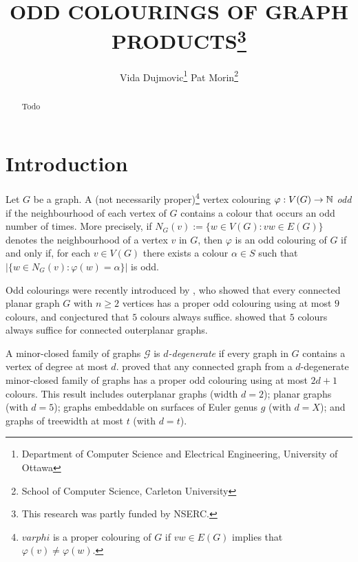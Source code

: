 \documentclass{patmorin}
\title{\MakeUppercase{Odd Colourings of Graph Products}\thanks{This research was partly funded by NSERC.}}
\author{%
  Vida Dujmovic\thanks{Department of Computer Science and Electrical Engineering, University of Ottawa}\qquad
  Pat Morin\thanks{School of Computer Science, Carleton University}
}
\date{}
\begin{document}
\maketitle

\begin{abstract}
  Todo
\end{abstract}

%

\section{Introduction}

Let $G$ be a graph.  A (not necessarily proper)\footnote{$varphi$ is a proper colouring of $G$ if $vw\in E(G)$ implies that $\varphi(v)\neq\varphi(w)$.} vertex colouring $\varphi:V(G)\to\mathbb{N}$ \emph{odd} if the neighbourhood of each vertex of $G$ contains a colour that occurs an odd number of times.  More precisely, if $N_G(v):=\{w\in V(G):vw\in E(G)\}$ denotes the neighbourhood of a vertex $v$ in $G$, then $\varphi$ is an odd colouring of $G$ if and only if, for each $v\in V(G)$ there exists a colour $\alpha\in S$ such that $|\{w\in N_G(v): \varphi(w)=\alpha\}|$ is odd.

Odd colourings were recently introduced by \citet{petrusevski.skrekovski:colorings}, who showed that every connected planar graph $G$ with $n\ge 2$ vertices has a proper odd colouring using at most $9$ colours, and conjectured that $5$ colours always suffice.  \citet{caro.petrusevski.ea:remarks} showed that $5$ colours always suffice for connected outerplanar graphs.

A minor-closed family of graphs $\mathcal{G}$ is \emph{$d$-degenerate} if every graph in $G$ contains a vertex of degree at most $d$.
\citet{cranston.lafferty.ea:note} proved that any connected graph from a $d$-degenerate minor-closed family of graphs has a proper odd colouring using at most $2d+1$ colours.  This result includes outerplanar graphs (width $d=2$); planar graphs (with $d=5$); graphs embeddable on surfaces of Euler genus $g$ (with $d=X$); and graphs of treewidth at most $t$ (with $d=t$).
\end{document}
